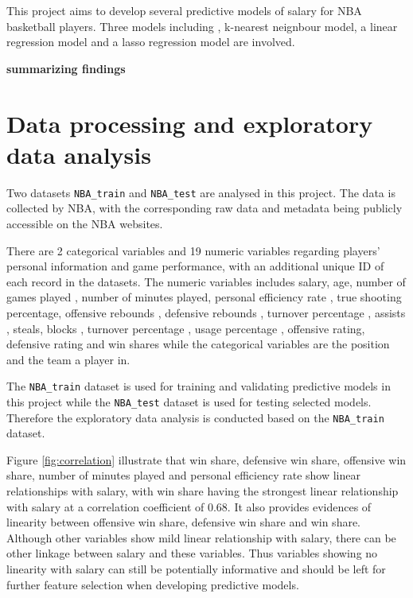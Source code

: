\documentclass[letterpaper,12pt,twoside,]{pinp}
\begin{document}
This project aims to develop several predictive models of salary for NBA
basketball players. Three models including , k-nearest neignbour model,
a linear regression model and a lasso regression model are involved.

\textbf{summarizing findings}

\hypertarget{data-processing-and-exploratory-data-analysis}{%
\section{Data processing and exploratory data
analysis}\label{data-processing-and-exploratory-data-analysis}}

Two datasets \texttt{NBA\_train} and \texttt{NBA\_test} are analysed in
this project. The data is collected by NBA, with the corresponding raw
data and metadata being publicly accessible on the NBA websites.

There are 2 categorical variables and 19 numeric variables regarding
players' personal information and game performance, with an additional
unique ID of each record in the datasets. The numeric variables includes
salary, age, number of games played , number of minutes played, personal
efficiency rate , true shooting percentage, offensive rebounds ,
defensive rebounds , turnover percentage , assists , steals, blocks ,
turnover percentage , usage percentage , offensive rating, defensive
rating and win shares while the categorical variables are the position
and the team a player in.

The \texttt{NBA\_train} dataset is used for training and validating
predictive models in this project while the \texttt{NBA\_test} dataset
is used for testing selected models. Therefore the exploratory data
analysis is conducted based on the \texttt{NBA\_train} dataset.

Figure \ref{fig:correlation} illustrate that win share, defensive win
share, offensive win share, number of minutes played and personal
efficiency rate show linear relationships with salary, with win share
having the strongest linear relationship with salary at a correlation
coefficient of 0.68. It also provides evidences of linearity between
offensive win share, defensive win share and win share. Although other
variables show mild linear relationship with salary, there can be other
linkage between salary and these variables. Thus variables showing no
linearity with salary can still be potentially informative and should be
left for further feature selection when developing predictive models.
\end{document}
